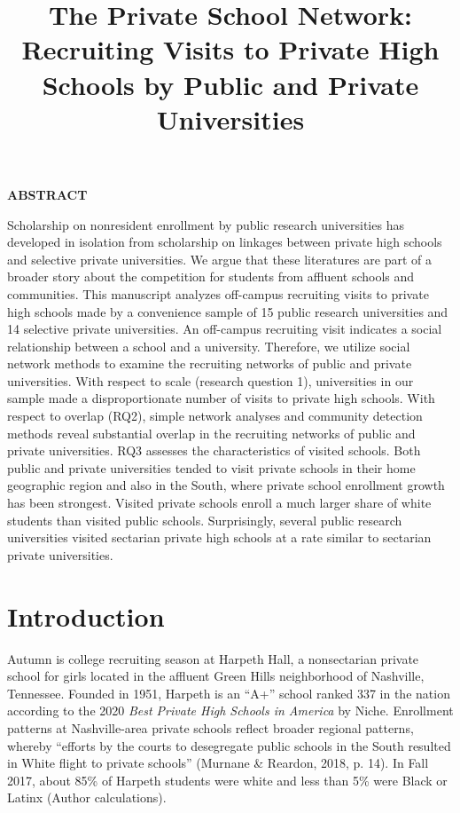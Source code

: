 \documentclass[
  12pt,
]{article}
\title{The Private School Network: Recruiting Visits to Private High Schools by Public and Private Universities}
\author{}
\date{\vspace{-2.5em}}
\begin{document}
\maketitle


\textbf{ABSTRACT}

Scholarship on nonresident enrollment by public research universities has developed in isolation from scholarship on linkages between private high schools and selective private universities. We argue that these literatures are part of a broader story about the competition for students from affluent schools and communities. This manuscript analyzes off-campus recruiting visits to private high schools made by a convenience sample of 15 public research universities and 14 selective private universities. An off-campus recruiting visit indicates a social relationship between a school and a university. Therefore, we utilize social network methods to examine the recruiting networks of public and private universities. With respect to scale (research question 1), universities in our sample made a disproportionate number of visits to private high schools. With respect to overlap (RQ2), simple network analyses and community detection methods reveal substantial overlap in the recruiting networks of public and private universities. RQ3 assesses the characteristics of visited schools. Both public and private universities tended to visit private schools in their home geographic region and also in the South, where private school enrollment growth has been strongest. Visited private schools enroll a much larger share of white students than visited public schools. Surprisingly, several public research universities visited sectarian private high schools at a rate similar to sectarian private universities.

\newpage
{}

\section{Introduction}\label{introduction}

Autumn is college recruiting season at Harpeth Hall, a nonsectarian private school for girls located in the affluent Green Hills neighborhood of Nashville, Tennessee. Founded in 1951, Harpeth is an ``A+'' school ranked 337 in the nation according to the 2020 \emph{Best Private High Schools in America} by Niche. Enrollment patterns at Nashville-area private schools reflect broader regional patterns, whereby ``efforts by the courts to desegregate public schools in the South resulted in White flight to private schools'' (Murnane \& Reardon, 2018, p. 14). In Fall 2017, about 85\% of Harpeth students were white and less than 5\% were Black or Latinx (Author calculations).
\end{document}
